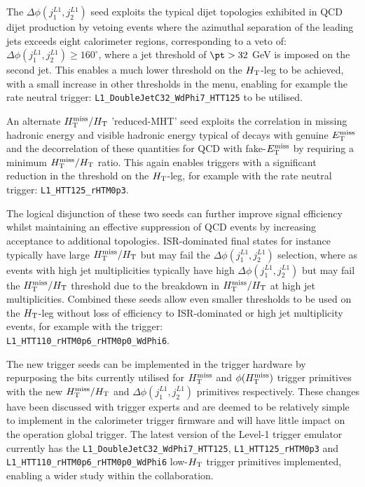 The $\Delta\phi(j_{1}^{L1},j_{2}^{L1})$ seed exploits the typical dijet topologies exhibited in QCD dijet production by vetoing events where the azimuthal separation of the leading jets exceeds eight calorimeter regions, corresponding to a veto of: $\Delta\phi(j_{1}^{L1},j_{2}^{L1}) \ge 160^{\circ}$, where a jet threshold of $\pt > 32$ GeV is imposed on the second jet. This enables a much lower threshold on the $\mbox{$H_\text{T}$}$-leg to be achieved, with a small increase in other thresholds in the menu, enabling for example the rate neutral trigger: \verb!L1_DoubleJetC32_WdPhi7_HTT125! to be utilised.

An alternate $\mbox{$H_{\rm T}^{\rm miss}$}/\mbox{$H_\text{T}$}$ 'reduced-MHT' seed exploits the correlation in missing hadronic energy and visible hadronic energy typical of decays with genuine $\mbox{$E_\text{T}^{\rm miss}$}$ and the decorrelation of these quantities for QCD with fake-$\mbox{$E_\text{T}^{\rm miss}$}$ by requiring a minimum $\mbox{$H_{\rm T}^{\rm miss}$}/\mbox{$H_\text{T}$}$ ratio. This again enables triggers with a significant reduction in the threshold on the $\mbox{$H_\text{T}$}$-leg, for example with the rate neutral trigger: \verb!L1_HTT125_rHTM0p3!.

The logical disjunction of these two seeds can further improve signal efficiency whilst maintaining an effective suppression of QCD events by increasing acceptance to additional topologies. ISR-dominated final states for instance typically have large $\mbox{$H_{\rm T}^{\rm miss}$}/\mbox{$H_\text{T}$}$ but may fail the $\Delta\phi(j_{1}^{L1},j_{2}^{L1})$ selection, where as events with high jet multiplicities typically have high $\Delta\phi(j_{1}^{L1},j_{2}^{L1})$ but may fail the $\mbox{$H_{\rm T}^{\rm miss}$}/\mbox{$H_\text{T}$}$ threshold due to the breakdown in $\mbox{$H_{\rm T}^{\rm miss}$}/\mbox{$H_\text{T}$}$ at high jet multiplicities. Combined these seeds allow even smaller thresholds to be used on the $\mbox{$H_\text{T}$}$-leg without loss of efficiency to ISR-dominated or high jet multiplicity events, for example with the trigger:\\ \verb!L1_HTT110_rHTM0p6_rHTM0p0_WdPhi6!.

The new trigger seeds can be implemented in the trigger hardware by repurposing the bits currently utilised for $\mbox{$H_{\rm T}^{\rm miss}$}$ and $\phi({\mbox{$H_{\rm T}^{\rm miss}$}})$ trigger primitives with the new $\mbox{$H_{\rm T}^{\rm miss}$}/\mbox{$H_\text{T}$}$ and $\Delta\phi(j_{1}^{L1},j_{2}^{L1})$ primitives respectively. These changes have been discussed with trigger experts and are deemed to be relatively simple to implement in the calorimeter trigger firmware and will have little impact on the operation global trigger. The latest version of the Level-1 trigger emulator currently has the \verb!L1_DoubleJetC32_WdPhi7_HTT125!, \verb!L1_HTT125_rHTM0p3! and \\ \verb!L1_HTT110_rHTM0p6_rHTM0p0_WdPhi6! low-$\mbox{$H_\text{T}$}$ trigger primitives implemented, enabling a wider study within the collaboration.

